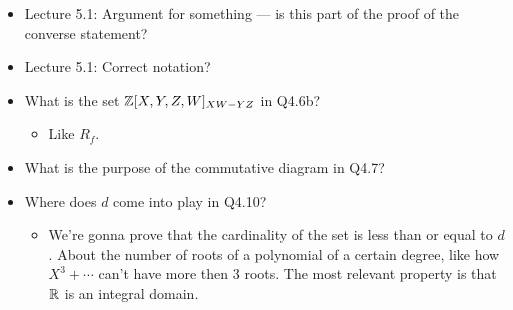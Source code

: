 \documentclass[../notes.tex]{subfiles}
\begin{document}
\begin{itemize}
\begin{itemize}
    \end{itemize}
    \item Lecture 5.1: Argument for something --- is this part of the proof of the converse statement?
    \item Lecture 5.1: Correct notation?
    \item What is the set $\mathbb{Z}[X,Y,Z,W]_{XW-YZ}$ in Q4.6b?
    \begin{itemize}
        \item Like $R_f$.
    \end{itemize}
    \item What is the purpose of the commutative diagram in Q4.7?
    \item Where does $d$ come into play in Q4.10?
    \begin{itemize}
        \item We're gonna prove that the cardinality of the set is less than or equal to $d$. About the number of roots of a polynomial of a certain degree, like how $X^3+\cdots$ can't have more then 3 roots. The most relevant property is that $\mathbb{R}$ is an integral domain.
    \end{itemize}
\end{itemize}
\end{document}
